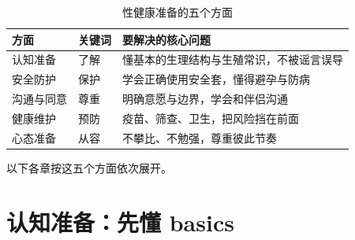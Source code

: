 \documentclass[12pt,UTF8,openany]{ctexbook}
\begin{document}
\begin{table}[htbp]
  \centering
  \caption{性健康准备的五个方面}
  \begin{tabularx}{\textwidth}{@{}l l X@{}}
    \toprule
    \textbf{方面} & \textbf{关键词} & \textbf{要解决的核心问题} \\
    \midrule
    认知准备   & 了解       & 懂基本的生理结构与生殖常识，不被谣言误导 \\
    安全防护   & 保护       & 学会正确使用安全套，懂得避孕与防病 \\
    沟通与同意 & 尊重       & 明确意愿与边界，学会和伴侣沟通 \\
    健康维护   & 预防       & 疫苗、筛查、卫生，把风险挡在前面 \\
    心态准备   & 从容       & 不攀比、不勉强，尊重彼此节奏 \\
    \bottomrule
  \end{tabularx}
\end{table}

以下各章按这五个方面依次展开。

\chapter{认知准备：先懂 basics}
\end{document}
